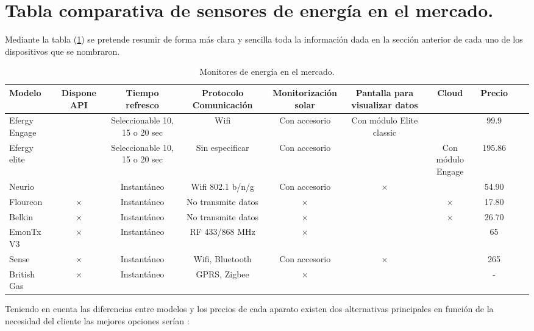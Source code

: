 \section{Tabla comparativa de sensores de energía en el mercado.}
Mediante la tabla (\ref{tabla:monitores}) se pretende resumir de forma más clara y sencilla toda la información dada en la sección anterior de cada uno de los dispositivos que se nombraron.

\begin{landscape}
	
	\begin{table}
	
			\resizebox{25cm}{!} {
				\begin{tabular}{|l||c|c|c|c|c|c|c|c|c|}
					\hline
					Modelo & Dispone API & Tiempo refresco & Protocolo Comunicación & Monitorización solar & Pantalla para visualizar datos & Cloud & Precio\EUR{} \\
					\hline \hline 
					Efergy Engage & \checkmark & Seleccionable 10, 15 o 20 sec & Wifi & Con accesorio & Con módulo Elite classic & \checkmark & 99.9\\ \hline
					Efergy elite  & \checkmark & Seleccionable 10, 15 o 20 sec & Sin especificar & Con accesorio & \checkmark & Con módulo Engage & 195.86\\ \hline
					Neurio & \checkmark & Instantáneo & Wifi 802.1 b/n/g & Con accesorio & $\times$ & \checkmark & 54.90\\ \hline
					Floureon & $\times$ & Instantáneo & No transmite datos & $\times$ & \checkmark & $\times$ & 17.80\\ \hline
					Belkin & $\times$ & Instantáneo & No transmite datos & $\times$ & \checkmark & $\times$ & 26.70\\ \hline
					EmonTx V3 & $\times$ & Instantáneo & RF 433/868 MHz & $\times$ & \checkmark & \checkmark & 65\\ \hline
					Sense & $\times$ & Instantáneo & Wifi, Bluetooth & Con accesorio & $\times$ & \checkmark & 265\\ \hline
					British Gas & $\times$ & Instantáneo & GPRS, Zigbee & $\times$ & \checkmark & \checkmark & -\\ \hline
				\end{tabular}
			}
			\caption{Monitores de energía en el mercado.}
			\label{tabla:monitores}
	\end{table}

\end{landscape}

Teniendo en cuenta las diferencias entre modelos y los precios de cada aparato existen dos alternativas principales en función de la necesidad del cliente las mejores opciones serían :

